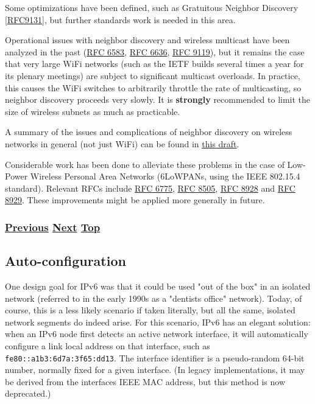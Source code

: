 \documentclass[
]{article}
\begin{document}
Some optimizations have been defined, such as Gratuitous Neighbor
Discovery {[}\href{https://www.rfc-editor.org/info/rfc9131}{RFC9131}{]},
but further standards work is needed in this area.

Operational issues with neighbor discovery and wireless multicast have
been analyzed in the past
(\href{https://www.rfc-editor.org/info/rfc6583}{RFC 6583},
\href{https://www.rfc-editor.org/info/rfc6636}{RFC 6636},
\href{https://www.rfc-editor.org/info/rfc9119}{RFC 9119}), but it
remains the case that very large WiFi networks (such as the IETF builds
several times a year for its plenary meetings) are subject to
significant multicast overloads. In practice, this causes the WiFi
switches to arbitrarily throttle the rate of multicasting, so neighbor
discovery proceeds very slowly. It is \textbf{strongly} recommended to
limit the size of wireless subnets as much as practicable.

A summary of the issues and complications of neighbor discovery on
wireless networks in general (not just WiFi) can be found in
\href{https://datatracker.ietf.org/doc/draft-ietf-6man-ipv6-over-wireless/}{this
draft}.

Considerable work has been done to alleviate these problems in the case
of Low-Power Wireless Personal Area Networks (6LoWPANs, using the IEEE
802.15.4 standard). Relevant RFCs include
\href{https://www.rfc-editor.org/info/rfc6775}{RFC 6775},
\href{https://www.rfc-editor.org/info/rfc8505}{RFC 8505},
\href{https://www.rfc-editor.org/info/rfc8928}{RFC 8928} and
\href{https://www.rfc-editor.org/info/rfc8929}{RFC 8929}. These
improvements might be applied more generally in future.

\subsubsection{\texorpdfstring{\hyperref[layer-2-functions]{Previous}
\hyperref[auto-configuration]{Next}
\hyperref[ipv6-basic-technology]{Top}}{Previous Next Top}}\label{previous-next-top-10}

\pagebreak

\subsection{Auto-configuration}\label{auto-configuration}

One design goal for IPv6 was that it could be used "out of the box" in
an isolated network (referred to in the early 1990s as a
"dentist\textquotesingle s office" network). Today, of course, this is a
less likely scenario if taken literally, but all the same, isolated
network segments do indeed arise. For this scenario, IPv6 has an elegant
solution: when an IPv6 node first detects an active network interface,
it will automatically configure a link local address on that interface,
such as \texttt{fe80::a1b3:6d7a:3f65:dd13}. The interface identifier is
a pseudo-random 64-bit number, normally fixed for a given interface. (In
legacy implementations, it may be derived from the
interface\textquotesingle s IEEE MAC address, but this method is now
deprecated.)
\end{document}
